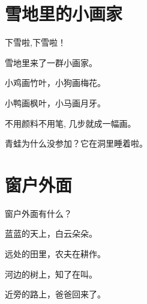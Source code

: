 \documentclass[12pt,UTF-8,openany]{ctexbook}
\begin{document}
\chapter{雪地里的小画家}

\begin{large}
    
    下雪啦,下雪啦！
    
    雪地里来了一群小画家。
    
    小鸡画竹叶，小狗画梅花。
    
    小鸭画枫叶，小马画月牙。
    
    不用颜料不用笔, 几步就成一幅画。
    
    青蛙为什么没参加？它在洞里睡着啦。
    
\end{large}


\clearpage

\begin{center}
    
\end{center}


\hanzibox{}\hanzibox{}\hanzibox{}\hanzibox{}\hspace{1em}\hanzibox{}\hanzibox{}\hanzibox{}\hanzibox{}

\hanzibox{}\hanzibox{}\hanzibox{}\hanzibox{}\hspace{1em}\hanzibox{}\hanzibox{}\hanzibox{}\hanzibox{}

\hanzibox{}\hanzibox{}\hanzibox{}\hanzibox{}\hspace{1em}




\chapter{窗户外面}

\begin{large}
    
    窗户外面有什么？
    
    蓝蓝的天上，白云朵朵。
    
    远处的田里，农夫在耕作。
    
    河边的树上，知了在叫。
    
    近旁的路上，爸爸回来了。
    
\end{large}
\end{document}
